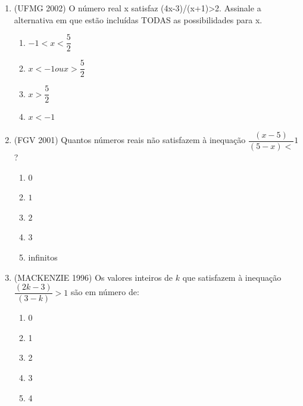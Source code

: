 \begin{enumerate}
\item (UFMG 2002) O número real x satisfaz (4x-3)/(x+1)>2. Assinale a alternativa em que estão incluídas TODAS as possibilidades para x.
\begin{enumerate}
\item $-1 < x < \dfrac{5}{2}$
\item $x < -1 ou x > \dfrac{5}{2}$
\item $x > \dfrac{5}{2}$
\item $x < -1$
\end{enumerate}


\item (FGV 2001) Quantos números reais não satisfazem à inequação $\dfrac{(x-5)}{(5-x)<}1$?
\begin{enumerate}
\item $0$
\item $1$
\item $2$
\item $3$
\item infinitos
\end{enumerate}


\item (MACKENZIE 1996) Os valores inteiros de $k$ que satisfazem à inequação $\dfrac{(2k-3)}{(3-k)}>1$ são em número de:
\begin{enumerate}
\item 0
\item 1
\item 2
\item 3
\item 4
\end{enumerate}



\end{enumerate}

\ifnum{}
\clearpage
\else
\notasfinais
\fi




\nocite{*}
